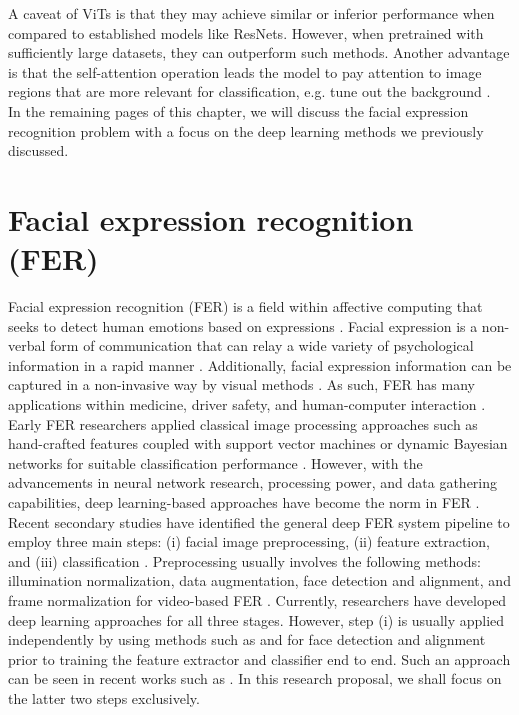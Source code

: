 \documentclass[../main.tex]{subfiles}
\begin{document}
A caveat of ViTs is that they may achieve similar or inferior performance when compared to established models like ResNets.
However, when pretrained with sufficiently large datasets, they can outperform such methods.
Another advantage is that the self-attention operation leads the model to pay attention to image regions that are more relevant for classification, e.g. tune out the background \cite{dosovitskiy2020vit}.\\

In the remaining pages of this chapter, we will discuss the facial expression recognition problem with a focus on the deep learning methods we previously discussed.

\section{Facial expression recognition (FER)}

Facial expression recognition (FER) is a field within affective computing that seeks to detect human emotions based on expressions \cite{karnati2023survey}.
Facial expression is a non-verbal form of communication that can relay a wide variety of psychological information in a rapid manner \cite{sajjad2023survey}.
Additionally, facial expression information can be captured in a non-invasive way by visual methods \cite{umer2022augment}.
As such, FER has many applications within medicine, driver safety, and human-computer interaction \cite{li2022survey}.\\

Early FER researchers applied classical image processing approaches such as hand-crafted features coupled with support vector machines or dynamic Bayesian networks for suitable classification performance \cite{canal2022survey}.
However, with the advancements in neural network research, processing power, and data gathering capabilities, deep learning-based approaches have become the norm in FER \cite{li2022survey, karnati2023survey, canal2022survey}.\\

Recent secondary studies have identified the general deep FER system pipeline to employ three main steps: (i) facial image preprocessing, (ii) feature extraction, and (iii) classification \cite{li2022survey, karnati2023survey}. 
Preprocessing usually involves the following methods: illumination normalization, data augmentation, face detection and alignment, and frame normalization for video-based FER \cite{karnati2023survey}.
Currently, researchers have developed deep learning approaches for all three stages.
However, step (i) is usually applied independently by using methods such as \cite{mtcnn2016} and \cite{retinaface2020} for face detection and alignment prior to training the feature extractor and classifier end to end.
Such an approach can be seen in recent works such as \cite{eff-face2021, apvit2023, xue2021transfer, ma2023asf}.
In this research proposal, we shall focus on the latter two steps exclusively.\\
\end{document}
